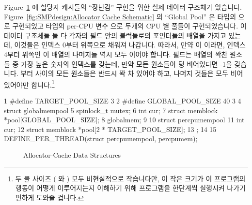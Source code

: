 Figure~\ref{fig:SMPdesign:Allocator-Cache Data Structures} 에 할당자 캐시들의
``장난감'' 구현을 위한 실제 데이터 구조체가 있습니다.
Figure~\ref{fig:SMPdesign:Allocator Cache Schematic} 의 ``Global Pool'' 은
 타입의  으로 구현되었고  타입의 per-CPU 변수  으로 두개의 CPU 별 풀들이
구현되었습니다.
이 데이터 구조체들 둘 다 각자의  필드 안의 블럭들로의 포인터들의
배열을 가지고 있는데, 이것들은 인덱스 0부터 위쪽으로 채워져 나갑니다.
따라서, 만약  이  이라면, 인덱스 4부터 위쪽인 이
배열의 나머지들 역시 모두  이어야 합니다.
 필드는  배열의 꽉찬 원소들 중 가장 높은 숫자의 인덱스를
갖는데, 만약 모든 원소들이 텅 비어있다면 -1을 갖습니다.
 부터  사이의 모든
원소들은 반드시 꽉 차 있어야 하고, 나머지 것들은 모두 비어있어야만
합니다.\footnote{
	두 풀 사이즈 ( 와 ) 모두
	비현실적으로 작습니다만, 이 작은 크기가 이 프로그램의 행동이 어떻게
	이루어지는지 이해하기 위해 프로그램을 한단계씩 실행시켜 나가기 편하게
	도와줄 겁니다.}

{ \scriptsize
\begin{verbbox}
  1 #define TARGET_POOL_SIZE 3
  2 #define GLOBAL_POOL_SIZE 40
  3
  4 struct globalmempool {
  5   spinlock_t mutex;
  6   int cur;
  7   struct memblock *pool[GLOBAL_POOL_SIZE];
  8 } globalmem;
  9
 10 struct percpumempool {
 11   int cur;
 12   struct memblock *pool[2 * TARGET_POOL_SIZE];
 13 };
 14
 15 DEFINE_PER_THREAD(struct percpumempool, percpumem);
\end{verbbox}
}
\begin{figure}[tbp]
\centering
\theverbbox
\caption{Allocator-Cache Data Structures}
\label{fig:SMPdesign:Allocator-Cache Data Structures}
\end{figure}


